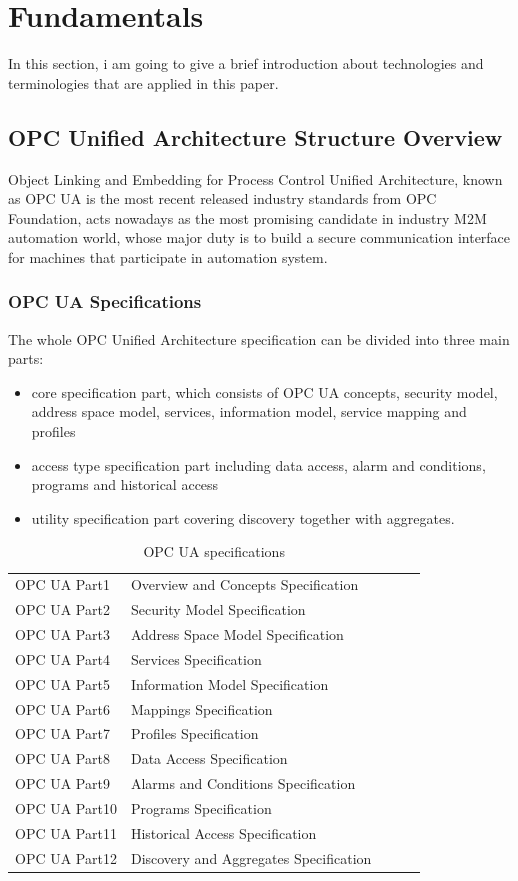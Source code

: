 \chapter{Fundamentals}

In this section, i am going to give a brief introduction about technologies and terminologies that are applied in this paper. 

\section{OPC Unified Architecture Structure Overview }
Object Linking and Embedding for Process Control Unified Architecture, known as OPC UA is the most recent released industry standards from OPC Foundation, acts nowadays as the most promising candidate in industry M2M automation world, whose major duty is to build a secure communication interface for machines that participate in automation system. 

\subsection{OPC UA Specifications}

The whole OPC Unified Architecture specification can be divided into three main parts:
\begin{itemize}
\item core specification part, which consists of OPC UA concepts, security model, address space model, services, information model, service mapping and profiles
\item access type specification part including data access, alarm and conditions, programs and historical access
\item utility specification part covering discovery together with aggregates.
\end{itemize}
\begin{table}[!htbp]
\caption{OPC UA specifications}
\centering
\begin{tabular}{lllll}
\hline\hline
OPC UA Part1 &Overview and Concepts Specification \\
OPC UA Part2 &Security Model Specification \\
OPC UA Part3 &Address Space Model Specification\\
OPC UA Part4 &Services Specification\\
OPC UA Part5 &Information Model Specification  \\
OPC UA Part6 &Mappings Specification \\
OPC UA Part7 &Profiles Specification \\
OPC UA Part8 &Data Access Specification  \\
OPC UA Part9 &Alarms and Conditions Specification \\
OPC UA Part10 &Programs Specification  \\
OPC UA Part11 &Historical Access Specification \\
OPC UA Part12 &Discovery and Aggregates Specification \\
\hline
\end{tabular}
\label{table:opcua}
\end{table}

